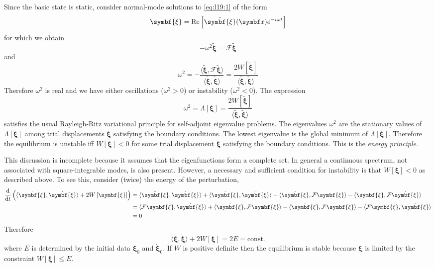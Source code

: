 \documentclass{jknotes}
\newcommand{\disp}{\symbf{\xi}}
\begin{document}
Since the basic state is static, consider normal-mode solutions to
\eqref{eq:l19:1} of the form
\begin{equation}
	\disp = \Re\left[ \tilde{\disp}(\x) e^{-i\omega t}\right]
\end{equation}
for which we obtain
\begin{equation}
	-\omega^2 \tilde{\disp} = \mathcal{F} \tilde{\disp}
\end{equation}
and
\begin{equation}
	\omega^2 = -\frac{\langle \tilde{\disp}, \mathcal{F} \tilde{\disp}
	\rangle}{\langle \tilde{\disp}, \tilde{\disp} \rangle} =
	\frac{2W\left[\tilde{\disp}\right]}{\langle \tilde{\disp},
		\tilde{\disp}\rangle}
\end{equation}
Therefore $\omega^2$ is real and we have either oscillations ($\omega^2 > 0$)
or instability ($\omega^2 < 0$). The expression
\begin{equation}
	\omega^2 = \Lambda\left[\disp\right] = 
	\frac{2W\left[\tilde{\disp}\right]}{\langle \tilde{\disp},
		\tilde{\disp}\rangle}
\end{equation}
satisfies the usual Rayleigh-Ritz variational principle for self-adjoint
eigenvalue problems. The eigenvalues $\omega^2$ are the stationary values of
$\Lambda\left[\disp\right]$ among trial displacements $\disp$ satisfying the
boundary conditions. The lowest eigenvalue is the global minimum of
$\Lambda\left[\disp\right]$. Therefore the equilibrium is unstable iff
$W\left[\disp\right] < 0$ for some trial displacement $\disp$ satisfying the
boundary conditions. This is the \emph{energy principle}. 

This discussion is incomplete because it assumes that the eigenfunctions form
a complete set. In general a continuous spectrum, not associated with
square-integrable modes, is also present. However, a necessary and sufficient
condition for instability is that $W\left[\disp\right] < 0$ as described
above. To see this, consider (twice) the energy of the perturbation,
\begin{align}
	\frac{\diffd}{\diffd t} \left( \langle \dot{\disp},\dot{\disp}\rangle +
	2W\left[\disp\right]\right) &= \langle \ddot{\disp},\dot{\disp}\rangle +
	\langle \dot{\disp}, \ddot{\disp}\rangle - \langle \dot{\disp},
	\mathcal{F} \disp \rangle - \langle \disp, \mathcal{F}\dot{\disp}\rangle
	\\
								&= \langle \mathcal{F}\disp, \dot{\disp}\rangle
								+ \langle \dot{\disp},\mathcal{F}\disp\rangle
								- \langle \dot{\disp}, \mathcal{F}\disp
								\rangle - \langle \mathcal{F} \disp,
								\dot{\disp}\rangle \\
								&= 0
\end{align}
Therefore
\begin{equation}
	\langle \dot{\disp},\dot{\disp}\rangle + 2W\left[\disp\right] = 2E =
	\text{const.}
\end{equation}
where $E$ is determined by the initial data $\disp_0$ and $\dot{\disp}_0$. If
$W$ is positive definite then the equilibrium is stable because $\disp$ is
limited by the constraint $W\left[\disp\right] \le E$. 
\end{document}
